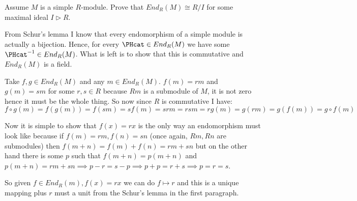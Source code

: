 \documentclass{article}
\begin{document}
\begin{problem}[3]{}
  Assume $M$ is a simple $R$-module. Prove that $End_R(M)\cong R/I$ for some maximal ideal $I\triangleright R$.
\end{problem}

From Schur's lemma I know that every endomorphism of a simple module is actually a bijection. Hence, for every $\text{\PHcat}\in End_R(M)$ we have some $\text{\PHcat}^{-1}\in End_R(M)$. What is left is to show that this is commutative and $End_R(M)$ is a field.

Take $f,g\in End_R(M)$ and any $m\in End_R(M)$. $f(m)=rm$ and $g(m)=sm$ for some $r,s\in R$ because $Rm$ is a submodule of $M$, it is not zero hence it must be the whole thing. So now since $R$ is commutative I have:
$$f\circ g(m)=f(g(m))=f(sm)=sf(m)=srm=rsm=rg(m)=g(rm)=g(f(m))=g\circ f(m)$$

Now it is simple to show that $f(x)=rx$ is the only way an endomorphism must look like because if $f(m)=rm, f(n)=sn$ (once again, $Rm, Rn$ are submodules) then $f(m+n)=f(m)+f(n)=rm+sn$ but on the other hand there is some $p$ such that $f(m+n)=p(m+n)$ and $p(m+n)=rm+sn\implies p-r=s-p\implies p+p=r+s\implies p=r=s$.

So given $f\in End_R(m), f(x)=rx$ we can do $f\mapsto r$ and this is a unique mapping plus $r$ must a unit from the Schur's lemma in the first paragraph.

%
\end{document}
